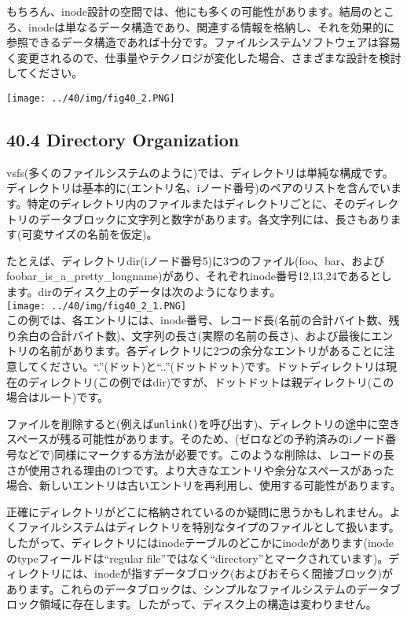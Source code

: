 もちろん、inode設計の空間では、他にも多くの可能性があります。結局のところ、inodeは単なるデータ構造であり、関連する情報を格納し、それを効果的に参照できるデータ構造であれば十分です。ファイルシステムソフトウェアは容易く変更されるので、仕事量やテクノロジが変化した場合、さまざまな設計を検討してください。

\texttt{[image: ../40/img/fig40\_2.PNG]}

\hypertarget{directory-organization}{%
\subsection*{40.4 Directory Organization}\label{directory-organization}}

vsfs(多くのファイルシステムのように)では、ディレクトリは単純な構成です。ディレクトリは基本的に(エントリ名、iノード番号)のペアのリストを含んでいます。特定のディレクトリ内のファイルまたはディレクトリごとに、そのディレクトリのデータブロックに文字列と数字があります。各文字列には、長さもあります(可変サイズの名前を仮定)。

たとえば、ディレクトリdir(iノード番号5)に3つのファイル(foo、bar、およびfoobar\_is\_a\_pretty\_longname)があり、それぞれinode番号12,13,24であるとします。dirのディスク上のデータは次のようになります。\\
\texttt{[image: ../40/img/fig40\_2\_1.PNG]}\\
この例では、各エントリには、inode番号、レコード長(名前の合計バイト数、残り余白の合計バイト数)、文字列の長さ(実際の名前の長さ)、および最後にエントリの名前があります。各ディレクトリに2つの余分なエントリがあることに注意してください。``.''(ドット)と``..''(ドットドット)です。ドットディレクトリは現在のディレクトリ(この例ではdir)ですが、ドットドットは親ディレクトリ(この場合はルート)です。

ファイルを削除すると(例えば\texttt{unlink()}を呼び出す)、ディレクトリの途中に空きスペースが残る可能性があります。そのため、(ゼロなどの予約済みのiノード番号などで)同様にマークする方法が必要です。このような削除は、レコードの長さが使用される理由の1つです。より大きなエントリや余分なスペースがあった場合、新しいエントリは古いエントリを再利用し、使用する可能性があります。

正確にディレクトリがどこに格納されているのか疑問に思うかもしれません。よくファイルシステムはディレクトリを特別なタイプのファイルとして扱います。したがって、ディレクトリにはinodeテーブルのどこかにinodeがあります(inodeのtypeフィールドは``regular
file''ではなく``directory''とマークされています)。ディレクトリには、inodeが指すデータブロック(およびおそらく間接ブロック)があります。これらのデータブロックは、シンプルなファイルシステムのデータブロック領域に存在します。したがって、ディスク上の構造は変わりません。

